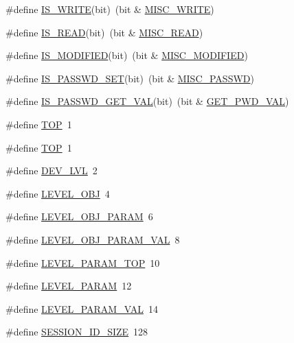 \begin{DoxyCompactItemize}
\item 
\#define \hyperlink{group__LIBHELP_gace0dbce830b493e8d28c9f0fa521fcfa}{I\-S\-\_\-\-W\-R\-I\-T\-E}(bit)~(bit \& \hyperlink{group__LIBHELP_gga3329d9d369a4ae5cfa5d8eac33a0c0c6ad9e91523aade4ed4de08b0c3e6572d90}{M\-I\-S\-C\-\_\-\-W\-R\-I\-T\-E})
\item 
\#define \hyperlink{group__LIBHELP_ga3b4eeb13c5583808221824d770a6afc8}{I\-S\-\_\-\-R\-E\-A\-D}(bit)~(bit \& \hyperlink{group__LIBHELP_gga3329d9d369a4ae5cfa5d8eac33a0c0c6a466a6336da6be62cf6f7fe57c6379597}{M\-I\-S\-C\-\_\-\-R\-E\-A\-D})
\item 
\#define \hyperlink{group__LIBHELP_ga6ffa31aea95d58b70b0a0ec441ffb642}{I\-S\-\_\-\-M\-O\-D\-I\-F\-I\-E\-D}(bit)~(bit \& \hyperlink{group__LIBHELP_gga3329d9d369a4ae5cfa5d8eac33a0c0c6a99826fb8db4c7fce0a1678c6d8afc054}{M\-I\-S\-C\-\_\-\-M\-O\-D\-I\-F\-I\-E\-D})
\item 
\#define \hyperlink{group__LIBHELP_ga4bdee20520c06be0cb37b99ee6a92ff4}{I\-S\-\_\-\-P\-A\-S\-S\-W\-D\-\_\-\-S\-E\-T}(bit)~(bit \& \hyperlink{group__LIBHELP_gga3329d9d369a4ae5cfa5d8eac33a0c0c6adcdd0a2c3bc54078987616b846b01896}{M\-I\-S\-C\-\_\-\-P\-A\-S\-S\-W\-D})
\item 
\#define \hyperlink{group__LIBHELP_ga8613fffcfa3adcdeb1188e187d767733}{I\-S\-\_\-\-P\-A\-S\-S\-W\-D\-\_\-\-G\-E\-T\-\_\-\-V\-A\-L}(bit)~(bit \& \hyperlink{group__LIBHELP_gga269cc0b81be50f8be29bcdbc1706fd64abbf52986e1d6e58b4e7d941dac80650a}{G\-E\-T\-\_\-\-P\-W\-D\-\_\-\-V\-A\-L})
\item 
\#define \hyperlink{group__LIBHELP_gafc0eef637f1016e8786e45e106a4881e}{T\-O\-P}~1
\item 
\#define \hyperlink{group__LIBHELP_gafc0eef637f1016e8786e45e106a4881e}{T\-O\-P}~1
\item 
\#define \hyperlink{group__LIBHELP_gaf7bf88a525ba310c5ceffd0b94b3ed09}{D\-E\-V\-\_\-\-L\-V\-L}~2
\item 
\#define \hyperlink{group__LIBHELP_ga9197bc708bae07bccd3f01550a7da13c}{L\-E\-V\-E\-L\-\_\-\-O\-B\-J}~4
\item 
\#define \hyperlink{group__LIBHELP_ga4f0cc609593ce12e46d48dc14e2e3720}{L\-E\-V\-E\-L\-\_\-\-O\-B\-J\-\_\-\-P\-A\-R\-A\-M}~6
\item 
\#define \hyperlink{group__LIBHELP_ga1f7722a29a324ee4440c52218bffebef}{L\-E\-V\-E\-L\-\_\-\-O\-B\-J\-\_\-\-P\-A\-R\-A\-M\-\_\-\-V\-A\-L}~8
\item 
\#define \hyperlink{group__LIBHELP_gac3f999a1a3235673b7babbfa1294afee}{L\-E\-V\-E\-L\-\_\-\-P\-A\-R\-A\-M\-\_\-\-T\-O\-P}~10
\item 
\#define \hyperlink{group__LIBHELP_ga8fabc94f5bafb2197057a88deee01926}{L\-E\-V\-E\-L\-\_\-\-P\-A\-R\-A\-M}~12
\item 
\#define \hyperlink{group__LIBHELP_gaae4f330d3207e58934ca25df51265f98}{L\-E\-V\-E\-L\-\_\-\-P\-A\-R\-A\-M\-\_\-\-V\-A\-L}~14
\item 
\#define \hyperlink{group__LIBHELP_ga29c1b676d6c99dcaad0edc4bf19cce8d}{S\-E\-S\-S\-I\-O\-N\-\_\-\-I\-D\-\_\-\-S\-I\-Z\-E}~128
\end{DoxyCompactItemize}

